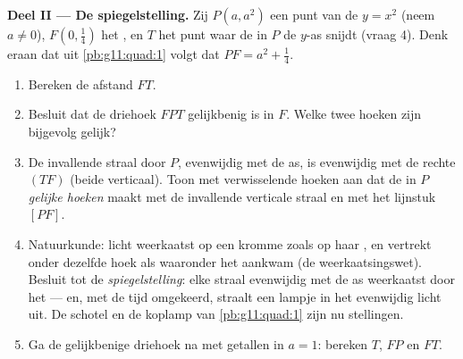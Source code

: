 \begin{problem}
\medskip
\noindent\textbf{Deel II --- De spiegelstelling.}
Zij $P(a, a^2)$ een punt van de  $y = x^2$ (neem $a \neq 0$),
$F\left(0, \frac14\right)$ het , en $T$ het punt waar de  in
$P$ de $y$-as snijdt (vraag 4). Denk eraan dat uit \cref{pb:g11:quad:1} volgt
dat $PF = a^2 + \frac14$.
\begin{enumerate}[resume]
  \item Bereken de afstand $FT$.
  \item Besluit dat de driehoek $FPT$ gelijkbenig is in $F$. Welke twee
        hoeken zijn bijgevolg gelijk?
  \item De invallende straal door $P$, evenwijdig met de as, is evenwijdig
        met de rechte $(TF)$ (beide verticaal). Toon met verwisselende hoeken
        aan dat de  in $P$ \emph{gelijke hoeken} maakt met de
        invallende verticale straal en met het lijnstuk $[PF]$.
  \item Natuurkunde: licht weerkaatst op een kromme zoals op haar ,
        en vertrekt onder dezelfde hoek als waaronder het aankwam (de
        weerkaatsingswet). Besluit tot de \emph{spiegelstelling}: elke straal
        evenwijdig met de as weerkaatst door het  --- en, met de tijd
        omgekeerd, straalt een lampje in het  evenwijdig licht uit.
        De schotel en de koplamp van \cref{pb:g11:quad:1} zijn nu stellingen.
  \item Ga de gelijkbenige driehoek na met getallen in $a = 1$: bereken $T$,
        $FP$ en $FT$.
\end{enumerate}


\end{problem}
